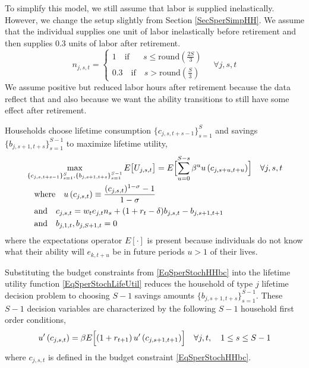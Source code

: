\documentclass[letterpaper,12pt]{article}
\theoremstyle{definition}
\numberwithin{equation}{section}
\numberwithin{exercise}{section}
\begin{document}
\begin{spacing}{1.5}
      To simplify this model, we still assume that labor is supplied inelastically. However, we change the setup slightly from Section \ref{SecSperSimpHH}. We assume that the individual supplies one unit of labor inelastically before retirement and then supplies 0.3 units of labor after retirement.
      \begin{equation}\label{EqSperStochHHlab}
         n_{j,s,t} =
            \begin{cases}
               1\quad\text{if}\quad\:\:\: s\leq \text{round}\left(\frac{2S}{3}\right) \\
               0.3\quad\text{if}\quad s> \text{round}\left(\frac{S}{3}\right)
            \end{cases} \quad\forall j,s,t
      \end{equation}
      We assume positive but reduced labor hours after retirement because the data reflect that and also because we want the ability transitions to still have some effect after retirement.

      Households choose lifetime consumption $\{c_{j,s,t+s-1}\}_{s=1}^S$ and savings $\{b_{j,s+1,t+s}\}_{s=1}^{S-1}$ to maximize lifetime utility,
      \begin{equation}\label{EqSperStochLifeUtil}
         \begin{split}
            &\max_{\{c_{j,s,t+s-1}\}_{s=1}^S,\{b_{j,s+1,t+s}\}_{s=1}^{S-1}}E\bigl[U_{j,s,t}\bigr] = E\Bigl[\sum_{u=0}^{S-s}\beta^u u\left(c_{j,s+u,t+u}\right)\Bigr] \quad\forall j,s,t \\
            &\quad\text{where}\quad u\left(c_{j,s,t}\right) \equiv\frac{(c_{j,s,t})^{1-\sigma} - 1}{1-\sigma} \\
            &\quad\text{and}\quad c_{j,s,t} = w_t e_{j,t}n_{s} + (1 + r_{t} - \delta)b_{j,s,t} - b_{j,s+1,t+1} \\
            &\quad\text{and}\quad b_{j,1,t},b_{j,S+1,t} = 0
         \end{split}
      \end{equation}
      where the expectations operator $E[\cdot]$ is present because individuals do not know what their ability will $e_{k,t+u}$ be in future periods $u>1$ of their lives.

      Substituting the budget constraints from \eqref{EqSperStochHHbc} into the lifetime utility function \eqref{EqSperStochLifeUtil} reduces the household of type $j$ lifetime decision problem to choosing $S-1$ savings amounts $\{b_{j,s+1,t+s}\}_{s=1}^{S-1}$. These $S-1$ decision variables are characterized by the following $S-1$ household first order conditions,
      \begin{equation}\label{EqSperStochfocbgen}
         u'\left(c_{j,s,t}\right) = \beta E\Bigl[\left(1 + r_{t+1}\right)u'\left(c_{j,s+1,t+1}\right)\Bigr] \quad\forall j,t,\quad 1\leq s\leq S-1
      \end{equation}
      where $c_{j,s,t}$ is defined in the budget constraint \eqref{EqSperStochHHbc}.


\end{spacing}
\end{document}
